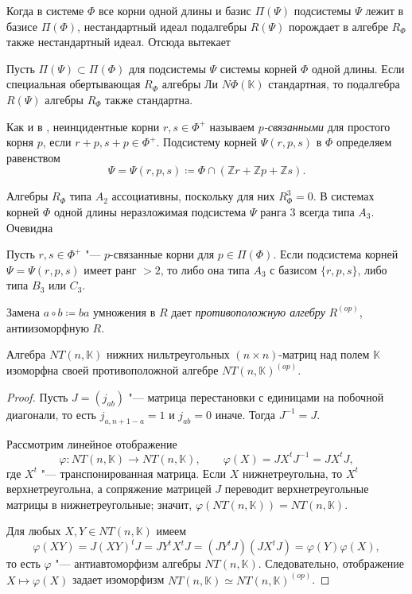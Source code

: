 \documentclass[a4paper,14pt,oneside,openany]{memoir}
\begin{document}
Когда в системе $\Phi$ все корни одной длины и базис $\Pi(\Psi)$ подсистемы
$\Psi$ лежит в базисе $\Pi(\Phi)$, нестандартный идеал подалгебры $R(\Psi)$
порождает в алгебре $R_{\Phi}$ также нестандартный идеал. Отсюда вытекает

\begin{lemma}\label{l:stand-subsystem}
    Пусть $\Pi(\Psi) \subset \Pi(\Phi)$ для подсистемы $\Psi$ системы корней $\Phi$
    одной длины. Если специальная обертывающая $R_{\Phi}$ алгебры Ли
    $N\Phi(\mathbb{K})$ стандартная, то подалгебра $R(\Psi)$ алгебры $R_{\Phi}$
    также стандартна.
\end{lemma}

Как и в \cite{JA-12}, неинцидентные корни $r,s\in\Phi^+$ называем
\emph{$p$-связанными} для простого корня $p$, если $r+p,s+p\in\Phi^+$.
Подсистему корней $\Psi(r,p,s)$ в $\Phi$ определяем равенством
\[
    \Psi=\Psi(r, p, s)\coloneq\Phi\cap (\mathbb{Z}r+\mathbb{Z}p+\mathbb{Z}s).
\]

Алгебры $R_{\Phi}$ типа $A_{2}$ ассоциативны, поскольку для них $R_{\Phi}^3=0$.
В системах корней $\Phi$ одной длины неразложимая подсистема $\Psi$ ранга 3
всегда типа $A_3$. Очевидна

\begin{lemma}\label{l:subsystem-rank3}
    Пусть $r,s\in\Phi^+$ "--- $p$-связанные корни для $p\in\Pi(\Phi)$. Если
    подсистема корней $\Psi=\Psi(r,p,s)$ имеет ранг $>2$, то либо она типа $A_3$ с
    базисом $\{r,p,s\}$, либо типа $B_3$ или $C_3$.
\end{lemma}

Замена $a\circ b\coloneq ba$ умножения в $R$ дает \emph{противоположную
    алгебру} $R^{(op)}$, антиизоморфную $R$.

\begin{lemma}\label{l:NT-opposite}
    Алгебра $NT(n,\mathbb{K})$ нижних нильтреугольных $(n\times n)$-матриц над
    полем $\mathbb{K}$ изоморфна своей противоположной алгебре
    $NT(n,\mathbb{K})^{(op)}$.
\end{lemma}
\begin{proof}
    Пусть $J=(j_{ab})$ "--- матрица перестановки с единицами на побочной диагонали,
    то есть $j_{a,n+1-a}=1$ и $j_{ab}=0$ иначе. Тогда $J^{-1}=J$.

    Рассмотрим линейное отображение
    \[
        \varphi\colon NT(n,\mathbb{K})\to NT(n,\mathbb{K}),\qquad \varphi(X)=JX^{t}J^{-1}=JX^tJ,
    \]
    где $X^t$ "--- транспонированная матрица. Если $X$ нижнетреугольна, то $X^t$
    верхнетреугольна, а сопряжение матрицей $J$ переводит верхнетреугольные матрицы
    в нижнетреугольные; значит, $\varphi(NT(n,\mathbb{K})) = NT(n,\mathbb{K})$.

    Для любых $X,Y\in NT(n,\mathbb{K})$ имеем
    \[
        \varphi(XY)=J(XY)^tJ=JY^tX^tJ=(JY^tJ)(JX^tJ)=\varphi(Y)\varphi(X),
    \]
    то есть $\varphi$ "--- антиавтоморфизм алгебры $NT(n,\mathbb{K})$.
    Следовательно, отображение $X\mapsto \varphi(X)$ задает изоморфизм
    $NT(n,\mathbb{K})\simeq NT(n,\mathbb{K})^{(op)}$.
\end{proof}
\end{document}
